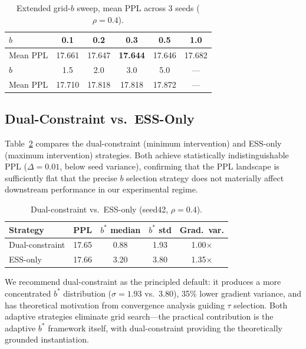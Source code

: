 \documentclass[11pt,a4paper]{article}
\newcommand{\bstar}{b^{*}}
\begin{document}
\begin{table}[t]
\centering
\small
\caption{Extended grid-$b$ sweep, mean PPL across 3 seeds ($\rho=0.4$).}
\label{tab:grid-extended}
\begin{tabular}{lccccc}
\toprule
$b$ & 0.1 & 0.2 & 0.3 & 0.5 & 1.0 \\
\midrule
Mean PPL & 17.661 & 17.647 & \textbf{17.644} & 17.646 & 17.682 \\
\midrule
$b$ & 1.5 & 2.0 & 3.0 & 5.0 & --- \\
\midrule
Mean PPL & 17.710 & 17.818 & 17.818 & 17.872 & --- \\
\bottomrule
\end{tabular}
\end{table}

\subsection{Dual-Constraint vs.\ ESS-Only}
\label{sec:dual-vs-ess}

Table~\ref{tab:dual-ess} compares the dual-constraint (minimum intervention) and ESS-only (maximum intervention) strategies.
Both achieve statistically indistinguishable PPL ($\Delta=0.01$, below seed variance), confirming that the PPL landscape is sufficiently flat that the precise $b$ selection strategy does not materially affect downstream performance in our experimental regime.

\begin{table}[t]
\centering
\small
\caption{Dual-constraint vs.\ ESS-only (seed42, $\rho=0.4$).}
\label{tab:dual-ess}
\begin{tabular}{lcccc}
\toprule
\textbf{Strategy} & \textbf{PPL} & $\bstar$ \textbf{median} & $\bstar$ \textbf{std} & \textbf{Grad.\ var.} \\
\midrule
Dual-constraint & 17.65 & 0.88 & 1.93 & 1.00$\times$ \\
ESS-only & 17.66 & 3.20 & 3.80 & 1.35$\times$ \\
\bottomrule
\end{tabular}
\end{table}

We recommend dual-constraint as the principled default: it produces a more concentrated $\bstar$ distribution ($\sigma=1.93$ vs.\ 3.80), 35\% lower gradient variance, and has theoretical motivation from convergence analysis guiding $\tau$ selection.
Both adaptive strategies eliminate grid search---the practical contribution is the adaptive $\bstar$ framework itself, with dual-constraint providing the theoretically grounded instantiation.
\end{document}
